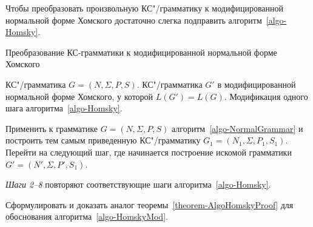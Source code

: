 Чтобы преобразовать произвольную КС"/грамматику к модифицированной нормальной форме Хомского достаточно слегка подправить алгоритм~\ref{algo-Homsky}.

\begin{AlgoEnv}[H]
\label{algo-Homsky-Mod}
\caption{Преобразование КС-грамматики к модифицированной нормальной форме Хомского}

\AlgoPre%
    {КС"/грамматика $G=(N,\Sigma,P,S)$.}
    {КС"/грамматика $G'$ в модифицированной нормальной форме Хомского, у которой $L(G')=L(G)$.}
    {Модификация одного шага алгоритма~\ref{algo-Homsky}.}

\vspace{-5mm}
\varhrulefill[.2pt]

\begin{algoenum}[leftmargin=2cm]
        \item
 Применить к грамматике $G=(N,\Sigma,P,S)$ алгоритм~\ref{algo-NormalGrammar} и построить тем самым приведенную КС"/грамматику $G_1=(N_1,\Sigma,P_1,S_1)$. Перейти на следующий шаг, где начинается построение искомой грамматики $G'=(N',\Sigma,P',S_1)$.

        \item[\textit{Шаги 2--8}]
 повторяют соответствующие шаги алгоритма~\ref{algo-Homsky}.
\end{algoenum}
\end{AlgoEnv}

\begin{myproblem}
Сформулировать и доказать аналог теоремы~\ref{theorem-AlgoHomskyProof} для обоснования алгоритма~\ref{algo-HomskyMod}.
\end{myproblem}


